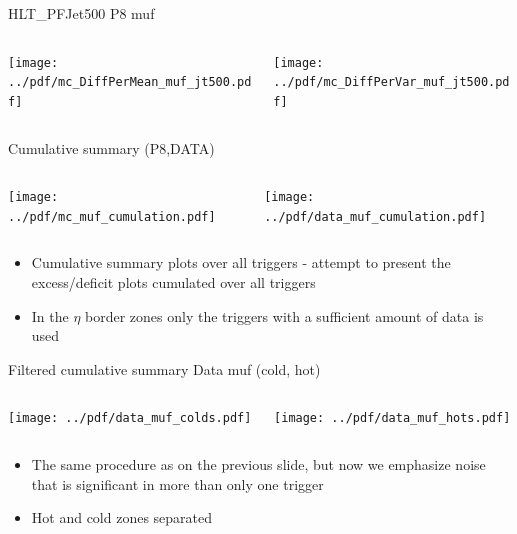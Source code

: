 \documentclass[9pt]{beamer}
\begin{document}
\begin{frame}[t]{HLT\_PFJet500 P8 muf}
\begin{columns}[T]
  \begin{column}{.5\textwidth}
  \texttt{[image: ../pdf/mc\_DiffPerMean\_muf\_jt500.pdf]}
  \end{column}
  \begin{column}{.5\textwidth}
  \texttt{[image: ../pdf/mc\_DiffPerVar\_muf\_jt500.pdf]}
  \end{column}
\end{columns}
\end{frame}

\begin{frame}[t]{Cumulative summary (P8,DATA)}
\begin{columns}[T]
  \begin{column}{.5\textwidth}
  \texttt{[image: ../pdf/mc\_muf\_cumulation.pdf]}
  \end{column}
  \begin{column}{.5\textwidth}
  \texttt{[image: ../pdf/data\_muf\_cumulation.pdf]}
  \end{column}
\end{columns}
\begin{itemize}
 \item Cumulative summary plots over all triggers - attempt to present the excess/deficit plots cumulated over all triggers
 \item In the $\eta$ border zones only the triggers with a sufficient amount of data is used
\end{itemize}
\end{frame}

\begin{frame}[t]{Filtered cumulative summary Data muf (cold, hot)}
\begin{columns}[T]
  \begin{column}{.5\textwidth}
  \texttt{[image: ../pdf/data\_muf\_colds.pdf]}
  \end{column}
  \begin{column}{.5\textwidth}
  \texttt{[image: ../pdf/data\_muf\_hots.pdf]}
  \end{column}
\end{columns}
\begin{itemize}
 \item The same procedure as on the previous slide, but now we emphasize noise that is significant in more than only one trigger
 \item Hot and cold zones separated
\end{itemize}
\end{frame}
\end{document}
